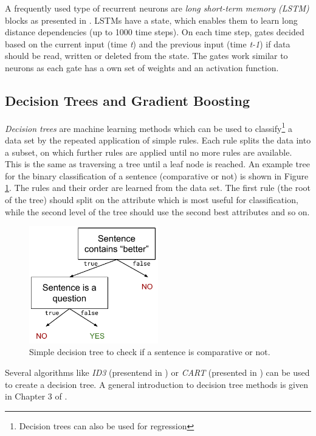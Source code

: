 A frequently used type of recurrent neurons are \emph{long short-term memory (LSTM)} blocks as presented in \cite{hochreiter1997long}. LSTMs have a state, which enables them to learn long distance dependencies (up to 1000 time steps). On each time step, gates decided based on the current input (time \emph{t}) and the previous input (time \emph{t-1}) if data should be read, written or deleted from the state. The gates work similar to neurons as each gate has a own set of weights and an activation function.


\subsection{Decision Trees and Gradient Boosting}
\emph{Decision trees} are machine learning methods which can be used to classify\footnote{Decision trees can also be used for regression} a data set by the repeated application of simple rules. Each rule splits the data into a subset, on which further rules are applied until no more rules are available. This is the same as traversing a tree until a leaf node is reached. An example tree for the binary classification of a sentence (comparative or not) is shown in Figure \ref{fig:dectree}. The rules and their order are learned from the data set. The first rule (the root of the tree) should split on the attribute which is most useful for classification, while the second level of the tree should use the second best attributes and so on.

\begin{figure}[ht]
\centering
	\includegraphics[width=0.5\textwidth]{images/dectree}
	\caption{Simple decision tree to check if a sentence is comparative or not.}
		\label{fig:dectree}
\end{figure}

Several algorithms like \emph{ID3} (presentend in \cite{quinlan1986induction}) or \emph{CART} (presented in \cite{breiman2017classification}) can be used to create a decision tree. A general introduction to decision tree methods is given in Chapter 3 of \cite{mitchell1997machine}.

